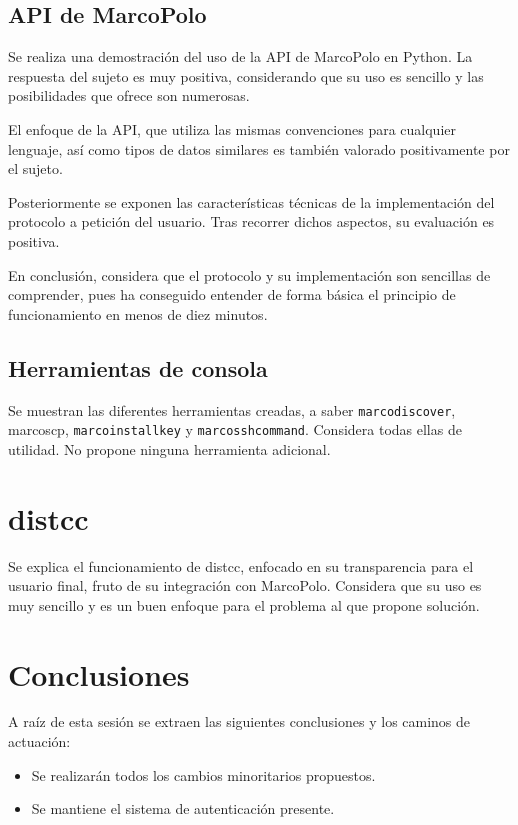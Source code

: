 \subsection{API de MarcoPolo}

Se realiza una demostración del uso de la API de MarcoPolo en Python. La respuesta del sujeto es muy positiva, considerando que su uso es sencillo y las posibilidades que ofrece son numerosas.

El enfoque de la API, que utiliza las mismas convenciones para cualquier lenguaje, así como tipos de datos similares es también valorado positivamente por el sujeto.

Posteriormente se exponen las características técnicas de la implementación del protocolo a petición del usuario. Tras recorrer dichos aspectos, su evaluación es positiva.

En conclusión, considera que el protocolo y su implementación son sencillas de comprender, pues ha conseguido entender de forma básica el principio de funcionamiento en menos de diez minutos.

\subsection{Herramientas de consola}

Se muestran las diferentes herramientas creadas, a saber \texttt{marcodiscover}, {marcoscp}, \texttt{marcoinstallkey} y \texttt{marcosshcommand}. Considera todas ellas de utilidad. No propone ninguna herramienta adicional.

\section{distcc}

Se explica el funcionamiento de distcc, enfocado en su transparencia para el usuario final, fruto de su integración con MarcoPolo. Considera que su uso es muy sencillo y es un buen enfoque para el problema al que propone solución. 


\section{Conclusiones}

A raíz de esta sesión se extraen las siguientes conclusiones y los caminos de actuación:

\begin{itemize}
\item Se realizarán todos los cambios minoritarios propuestos.
\item Se mantiene el sistema de autenticación presente.
\end{itemize}


